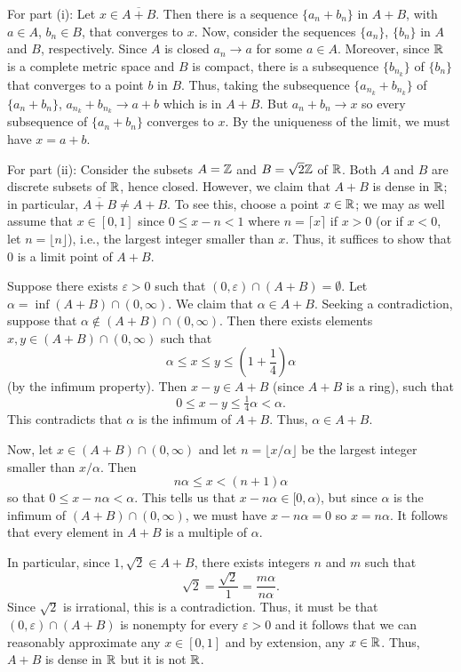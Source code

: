 \begin{solution}
  For part (i): Let $x\in\overline{A+B}$. Then there is a sequence
  $\{a_n+b_n\}$ in $A+B$, with $a\in A$, $b_n\in B$, that converges to
  $x$. Now, consider the sequences $\{a_n\}$, $\{b_n\}$ in $A$ and $B$,
  respectively. Since $A$ is closed $a_n\to a$ for some $a\in A$. Moreover,
  since $\mathbb{R}$ is a complete metric space and $B$ is compact, there is a
  subsequence $\{b_{n_k}\}$ of $\{b_n\}$ that converges to a point $b$ in
  $B$. Thus, taking the subsequence $\{a_{n_k}+b_{n_k}\}$ of $\{a_n+b_n\}$,
  $a_{n_k}+b_{n_k}\to a+b$ which is in $A+B$. But $a_n+b_n\to x$ so every
  subsequence of $\{a_n+b_n\}$ converges to $x$. By the uniqueness of the
  limit, we must have $x=a+b$.

  For part (ii): Consider the subsets $A=\mathbb{Z}$ and $B=\sqrt{2}\mathbb{Z}$ of
  $\mathbb{R}$. Both $A$ and $B$ are discrete subsets of $\mathbb{R}$, hence
  closed. However, we claim that $A+B$ is dense in $\mathbb{R}$; in particular,
  $\overline{A+B}\neq A+B$. To see this, choose a point $x\in\mathbb{R}$; we may
  as well assume that $x\in[0,1]$ since $0\leq x-n<1$ where
  $n=\lceil x \rceil$ if $x>0$ (or if $x<0$, let $n=\lfloor n\rfloor$),
  i.e., the largest integer smaller than $x$. Thus, it suffices to show
  that $0$ is a limit point of $A+B$.

  Suppose there exists $\varepsilon>0$ such that
  $(0,\varepsilon)\cap(A+B)=\emptyset$. Let
  $\alpha=\inf (A+B)\cap(0,\infty)$. We claim that $\alpha\in A+B$. Seeking
  a contradiction, suppose that $\alpha\notin (A+B)\cap(0,\infty)$. Then
  there exists elements $x,y\in (A+B)\cap(0,\infty)$ such that
  \[
    \alpha\leq x\leq y\leq\left(1+\frac{1}{4}\right)\alpha
  \]
  (by the infimum property). Then $x-y\in A+B$ (since $A+B$ is a ring),
  such that
  \[
    0\leq x-y\leq\tfrac{1}{4}\alpha<\alpha.
  \]
  This contradicts that $\alpha$ is the infimum of $A+B$. Thus, $\alpha\in
  A+B$.

  Now, let $x\in (A+B)\cap(0,\infty)$ and let $n=\lfloor x/\alpha\rfloor$
  be the largest integer smaller than $x/\alpha$. Then
  \[
    n\alpha\leq x<(n+1)\alpha
  \]
  so that $0\leq x-n\alpha<\alpha$. This tells us that
  $x-n\alpha\in[0,\alpha)$, but since $\alpha$ is the infimum of
  $(A+B)\cap(0,\infty)$, we must have $x-n\alpha=0$ so $x=n\alpha$. It
  follows that every element in $A+B$ is a multiple of $\alpha$.

  In particular, since $1,\sqrt{2}\in A+B$, there exists integers $n$ and
  $m$ such that
  \[
    \sqrt{2}=\frac{\sqrt{2}}{1}=\frac{m\alpha}{n\alpha}.
  \]
  Since $\sqrt{2}$ is irrational, this is a contradiction. Thus, it must be
  that $(0,\varepsilon)\cap (A+B)$ is nonempty for every $\varepsilon>0$
  and it follows that we can reasonably approximate any $x\in[0,1]$ and by
  extension, any $x\in\mathbb{R}$. Thus, $A+B$ is dense in $\mathbb{R}$ but it is not
  $\mathbb{R}$.
\end{solution}

